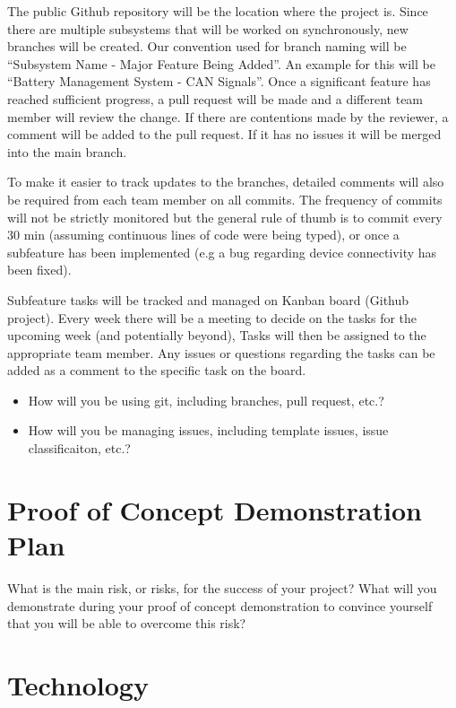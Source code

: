 \documentclass{article}
\begin{document}
The public Github repository will be the location where the project is.
Since there are multiple subsystems that will be worked on synchronously,
new branches will be created. Our convention used for branch naming will be
“Subsystem Name - Major Feature Being Added”. An example for this will be 
“Battery Management System - CAN Signals”. Once a significant feature has 
reached sufficient progress, a pull request will be made and a different 
team member will review the change. If there are contentions made by the 
reviewer, a comment will be added to the pull request. If it has no issues 
it will be merged into the main branch.


To make it easier to track updates to the branches, detailed comments will 
also be required from each team member on all commits. The frequency of 
commits will not be strictly monitored but the general rule of thumb is to
commit every 30 min (assuming continuous lines of code were being typed), 
or once a subfeature has been implemented (e.g a bug regarding device 
connectivity has been fixed). 

Subfeature tasks will be tracked and managed on Kanban board (Github 
project). Every week there will be a meeting to decide on the tasks for the
upcoming week (and potentially beyond), Tasks will then be assigned to the 
appropriate team member. Any issues or questions regarding the tasks can be 
added as a comment to the specific task on the board.

\begin{itemize}
	\item How will you be using git, including branches, pull request, etc.?
	\item How will you be managing issues, including template issues, issue
	classificaiton, etc.?
\end{itemize}

\section{Proof of Concept Demonstration Plan}

What is the main risk, or risks, for the success of your project?  What will you
demonstrate during your proof of concept demonstration to convince yourself that
you will be able to overcome this risk?

\section{Technology}
\end{document}
